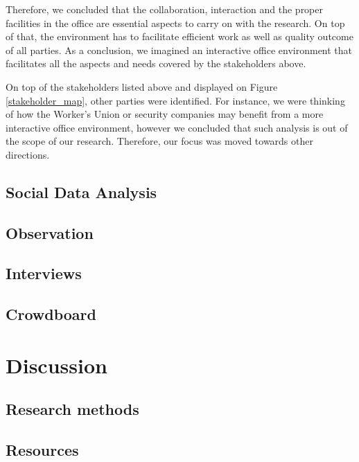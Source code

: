 \documentclass[english]{tktltiki}
\begin{document}
Therefore, we concluded that the collaboration, interaction and the proper facilities in the office are essential aspects to carry on with the research. On top of that, the environment has to facilitate efficient work as well as quality outcome of all parties. As a conclusion, we imagined an interactive office environment that facilitates all the aspects and needs covered by the stakeholders above. 

On top of the stakeholders listed above and displayed on Figure \ref{stakeholder_map}, other parties were identified. For instance, we were thinking of how the Worker's Union or security companies may benefit from a more interactive office environment, however we concluded that such analysis is out of the scope of our research. Therefore, our focus was moved towards other directions. 

\subsection{Social Data Analysis}


\subsection{Observation}


\subsection{Interviews}


\subsection{Crowdboard}
\label{sec:crowdboard}


\section{Discussion}
\subsection{Research methods}

\subsection{Resources}
\end{document}
